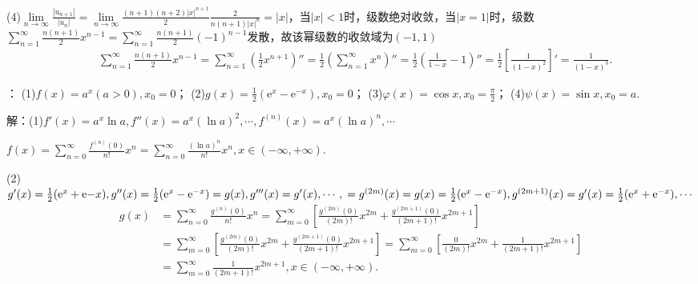 \documentclass[12pt,UTF8]{ctexart}
\newcommand\Lim[0]{\lim\limits_{n\rightarrow\infty}}
\newcommand\Ser[1]{\sum_{n=#1}^\infty}
\begin{document}
\begin{enumerate}
(4)$\Lim\frac{|u_{n+1}|}{|u_n|}=\Lim\frac{(n+1)(n+2)|x|^{n+1}}2\frac2{n(n+1)|x|^n}=|x|$，当$|x|<1$时，级数绝对收敛，当$|x=1|$时，级数$\Ser{1}\frac{n(n+1)}2x^{n-1}=\Ser{1}\frac{n(n+1)}2(-1)^{n-1}$发散，故该幂级数的收敛域为$(-1,1)$
\[\begin{split}
&\Ser{1}\frac{n(n+1)}2x^{n-1}=\Ser{1}(\frac12x^{n+1})''=\frac12(\Ser{1}x^n)''=\frac12(\frac1{1-x}-1)''=\frac12[\frac1{(1-x)^2}]'=\frac1{(1-x)^3}.
\end{split}\]

：
\newline
(1)$f(x)=a^x(a>0),x_0=0$；
\newline
(2)$g(x)=\frac12(\mathrm e^x-\mathrm e^{-x}),x_0=0$；
\newline
(3)$\varphi(x)=\cos x,x_0=\frac\pi2$；
\newline
(4)$\psi(x)=\sin x,x_0=a$.

解：(1)$f'(x)=a^x\ln a,f''(x)=a^x(\ln a)^2,\cdots,f^{(n)}(x)=a^x(\ln a)^n,\cdots$

$f(x)=\Ser{0}\frac{f^{(n)}(0)}{n!}x^n=\Ser{0}\frac{(\ln a)^n}{n!}x^n,x\in(-\infty,+\infty)$.

(2)$g'(x)=\frac12(\mathrm e^x+\mathrm e{-x}),g''(x)=\frac12(\mathrm e^x-\mathrm e^{-x})=g(x),g'''(x)=g'(x),\cdots,\\
=g^{(2m)}(x)=g(x)=\frac12(\mathrm e^x-\mathrm e^{-x}),g^{(2m+1)}(x)=g'(x)=\frac12(\mathrm e^x+\mathrm e^{-x}),\cdots$
\[\begin{split}
g(x)&=\Ser{0}\frac{g^{(n)}(0)}{n!}x^n=\sum_{m=0}^\infty[\frac{g^{(2m)}(0)}{(2m)!}x^{2m}+\frac{g^{(2m+1)}(0)}{(2m+1)!}x^{2m+1}]\\
&=\sum_{m=0}^\infty[\frac{g^{(2m)}(0)}{(2m)!}x^{2m}+\frac{g^{(2m+1)}(0)}{(2m+1)!}x^{2m+1}]=\sum_{m=0}^\infty[\frac0{(2m)!}x^{2m}+\frac1{(2m+1)!}x^{2m+1}]\\
&=\sum_{m=0}^\infty\frac1{(2m+1)!}x^{2m+1},x\in(-\infty,+\infty).
\end{split}\]


\end{enumerate}
\end{document}
